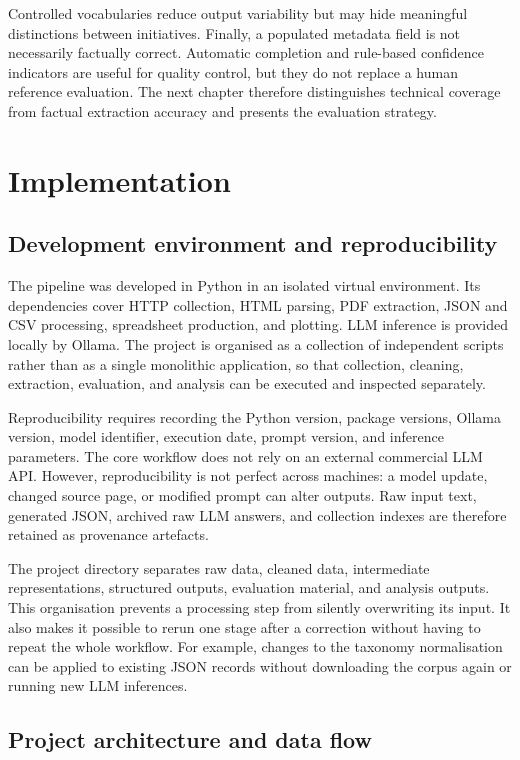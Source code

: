 \documentclass[
11pt,
english,
singlespacing,
headsepline,
]{MastersDoctoralThesis}
\begin{document}
Controlled vocabularies reduce output variability but may hide
meaningful distinctions between initiatives. Finally, a populated metadata field
is not necessarily factually correct. Automatic completion and rule-based
confidence indicators are useful for quality control, but they do not replace a
human reference evaluation. The next chapter therefore distinguishes technical
coverage from factual extraction accuracy and presents the evaluation strategy.

\chapter{Implementation}

\section{Development environment and reproducibility}

The pipeline was developed in Python in an isolated virtual environment. Its
dependencies cover HTTP collection, HTML parsing, PDF extraction, JSON and CSV
processing, spreadsheet production, and plotting. LLM inference is provided
locally by Ollama. The project is organised as a collection of independent
scripts rather than as a single monolithic application, so that collection,
cleaning, extraction, evaluation, and analysis can be executed and inspected
separately.

Reproducibility requires recording the Python version, package versions, Ollama
version, model identifier, execution date, prompt version, and inference
parameters. The core workflow does not rely on an external commercial LLM API.
However, reproducibility is not perfect across machines: a model update, changed
source page, or modified prompt can alter outputs. Raw input text, generated
JSON, archived raw LLM answers, and collection indexes are therefore retained as
provenance artefacts.

The project directory separates raw data, cleaned data, intermediate
representations, structured outputs, evaluation material, and analysis outputs.
This organisation prevents a processing step from silently overwriting its
input. It also makes it possible to rerun one stage after a correction without
having to repeat the whole workflow. For example, changes to the taxonomy
normalisation can be applied to existing JSON records without downloading the
corpus again or running new LLM inferences.

\section{Project architecture and data flow}
\end{document}
